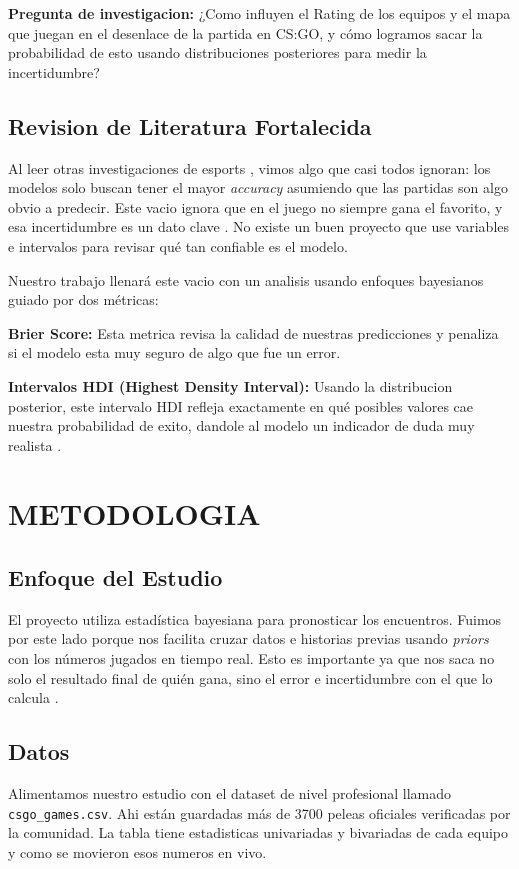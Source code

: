 \documentclass[twocolumn,10pt]{article}
\begin{document}
\textbf{Pregunta de investigacion:} ¿Como influyen el Rating de los equipos y el mapa que juegan en el desenlace de la partida en CS:GO, y cómo logramos sacar la probabilidad de esto usando distribuciones posteriores para medir la incertidumbre?

\subsection{Revision de Literatura Fortalecida}
Al leer otras investigaciones de esports \citep{hltv2024}, vimos algo que casi todos ignoran: los modelos solo buscan tener el mayor \textit{accuracy} asumiendo que las partidas son algo obvio a predecir. Este vacio ignora que en el juego no siempre gana el favorito, y esa incertidumbre es un dato clave \citep{csgodataset2020}. No existe un buen proyecto que use variables e intervalos para revisar qué tan confiable es el modelo.

Nuestro trabajo llenará este vacio con un analisis usando enfoques bayesianos guiado por dos métricas:

\textbf{Brier Score:} Esta metrica revisa la calidad de nuestras predicciones y penaliza si el modelo esta muy seguro de algo que fue un error.

\textbf{Intervalos HDI (Highest Density Interval):} Usando la distribucion posterior, este intervalo HDI refleja exactamente en qué posibles valores cae nuestra probabilidad de exito, dandole al modelo un indicador de duda muy realista \citep{kruschke2014doing}.

\section{METODOLOGIA}

\subsection{Enfoque del Estudio}
El proyecto utiliza estadística bayesiana para pronosticar los encuentros. Fuimos por este lado porque nos facilita cruzar datos e historias previas usando \textit{priors} con los números jugados en tiempo real. Esto es importante ya que nos saca no solo el resultado final de quién gana, sino el error e incertidumbre con el que lo calcula \citep{gelman2013bayesian}.

\subsection{Datos}
Alimentamos nuestro estudio con el dataset de nivel profesional llamado \texttt{csgo\_games.csv}. Ahi están guardadas más de 3700 peleas oficiales verificadas por la comunidad. La tabla tiene estadisticas univariadas y bivariadas de cada equipo y como se movieron esos numeros en vivo.
\end{document}
